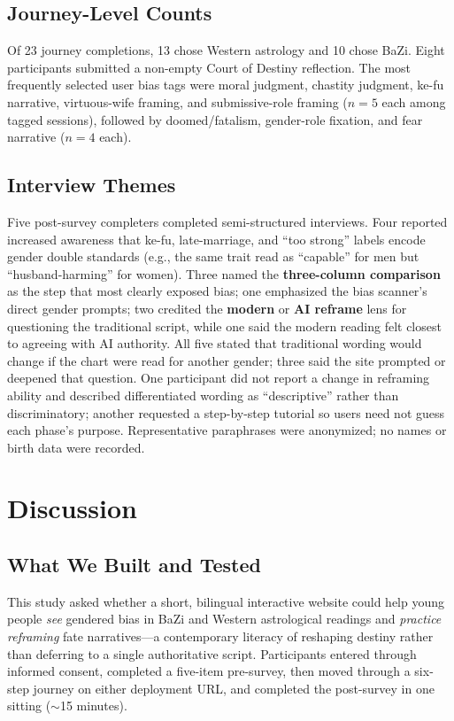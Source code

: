 \documentclass[stu,12pt,floatsintext]{apa7}
\begin{document}
\subsection{Journey-Level Counts}

Of 23 journey completions, 13 chose Western astrology and 10 chose BaZi. Eight participants submitted a non-empty Court of Destiny reflection. The most frequently selected user bias tags were moral judgment, chastity judgment, ke-fu narrative, virtuous-wife framing, and submissive-role framing ($n = 5$ each among tagged sessions), followed by doomed/fatalism, gender-role fixation, and fear narrative ($n = 4$ each).

\subsection{Interview Themes}

Five post-survey completers completed semi-structured interviews. Four reported increased awareness that ke-fu, late-marriage, and ``too strong'' labels encode gender double standards (e.g., the same trait read as ``capable'' for men but ``husband-harming'' for women). Three named the \textbf{three-column comparison} as the step that most clearly exposed bias; one emphasized the bias scanner's direct gender prompts; two credited the \textbf{modern} or \textbf{AI reframe} lens for questioning the traditional script, while one said the modern reading felt closest to agreeing with AI authority. All five stated that traditional wording would change if the chart were read for another gender; three said the site prompted or deepened that question. One participant did not report a change in reframing ability and described differentiated wording as ``descriptive'' rather than discriminatory; another requested a step-by-step tutorial so users need not guess each phase's purpose. Representative paraphrases were anonymized; no names or birth data were recorded.

\section{Discussion}

\subsection{What We Built and Tested}

This study asked whether a short, bilingual interactive website could help young people \emph{see} gendered bias in BaZi and Western astrological readings and \emph{practice reframing} fate narratives---a contemporary literacy of reshaping destiny rather than deferring to a single authoritative script. Participants entered through informed consent, completed a five-item pre-survey, then moved through a six-step journey on either deployment URL, and completed the post-survey in one sitting ($\sim$15 minutes).
\end{document}
